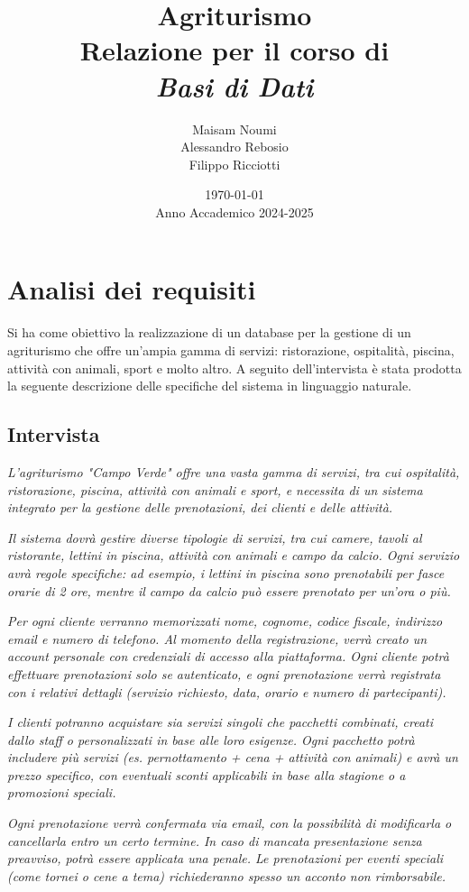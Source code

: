 \documentclass[a4paper,12pt]{report}
\title{
    \vspace*{2cm}
    \Huge\textbf{Agriturismo} \\[0.5cm]
    \LARGE Relazione per il corso di \\[0.2cm]
    \textit{Basi di Dati} \\[2cm]
}
\author{
    \Large
    Maisam Noumi \\
    Alessandro Rebosio \\
    Filippo Ricciotti
}
\date{
    \vspace{1cm}
    \today \\[0.5cm]
    Anno Accademico 2024-2025
}
\begin{document}
\maketitle

\tableofcontents

\chapter{Analisi dei requisiti}
Si ha come obiettivo la realizzazione di un database per la gestione di un agriturismo che offre un'ampia gamma di servizi: ristorazione,
ospitalità, piscina, attività con animali, sport e molto altro. A seguito dell'intervista è stata prodotta la seguente
descrizione delle specifiche del sistema in linguaggio naturale.

\section{Intervista}
\textit{L'agriturismo "Campo Verde" offre una vasta gamma di servizi, tra cui ospitalità, ristorazione, piscina, attività con animali
	e sport, e necessita di un sistema integrato per la gestione delle prenotazioni, dei clienti e delle attività.}

\textit{Il sistema dovrà gestire diverse tipologie di servizi, tra cui camere, tavoli al ristorante, lettini in piscina, attività
	con animali e campo da calcio. Ogni servizio avrà regole specifiche: ad esempio, i lettini in piscina sono prenotabili per fasce orarie
	di 2 ore, mentre il campo da calcio può essere prenotato per un'ora o più.}

\textit{Per ogni cliente verranno memorizzati nome, cognome, codice fiscale, indirizzo email e numero di telefono. Al momento della
	registrazione, verrà creato un account personale con credenziali di accesso alla piattaforma. Ogni cliente potrà effettuare prenotazioni
	solo se autenticato, e ogni prenotazione verrà registrata con i relativi dettagli (servizio richiesto, data, orario e numero di partecipanti).}

\textit{I clienti potranno acquistare sia servizi singoli che pacchetti combinati, creati dallo staff o personalizzati in base alle
	loro esigenze. Ogni pacchetto potrà includere più servizi (es. pernottamento + cena + attività con animali) e avrà un prezzo
	specifico, con eventuali sconti applicabili in base alla stagione o a promozioni speciali.}

\textit{Ogni prenotazione verrà confermata via email, con la possibilità di modificarla o cancellarla entro un certo termine. In
	caso di mancata presentazione senza preavviso, potrà essere applicata una penale. Le prenotazioni per eventi speciali (come tornei o cene a tema)
	richiederanno spesso un acconto non rimborsabile.}
\end{document}
